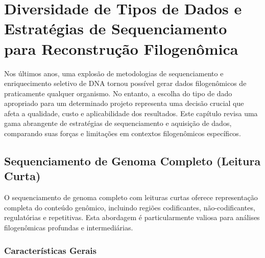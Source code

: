
\chapter{Diversidade de Tipos de Dados e Estratégias de Sequenciamento para Reconstrução Filogenômica}

Nos últimos anos, uma explosão de metodologias de sequenciamento e enriquecimento seletivo de DNA tornou possível gerar dados filogenômicos de praticamente qualquer organismo. No entanto, a escolha do tipo de dado apropriado para um determinado projeto representa uma decisão crucial que afeta a qualidade, custo e aplicabilidade dos resultados. Este capítulo revisa uma gama abrangente de estratégias de sequenciamento e aquisição de dados, comparando suas forças e limitações em contextos filogenômicos específicos.

\section{Sequenciamento de Genoma Completo (Leitura Curta)}

O sequenciamento de genoma completo com leituras curtas oferece representação completa do conteúdo genômico, incluindo regiões codificantes, não-codificantes, regulatórias e repetitivas. Esta abordagem é particularmente valiosa para análises filogenômicas profundas e intermediárias.

\subsection{Características Gerais}

